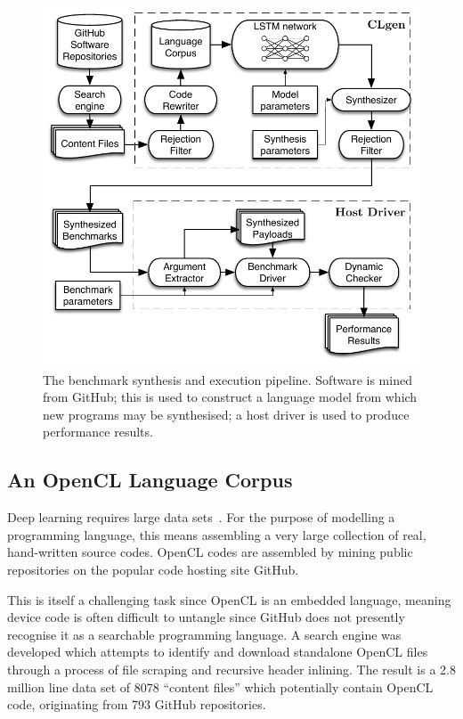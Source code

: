 \begin{figure}
	\centering%
	\includegraphics[width=\columnwidth]{img/pipeline}%
	\caption[Benchmark synthesis and execution pipeline]{%
    The benchmark synthesis and execution pipeline. Software is mined from GitHub; this is used to construct a language model from which new programs may be synthesised; a host driver is used to produce performance results.%
  }%
	\label{fig:clgen-pipeline}
\end{figure}

\subsection{An OpenCL Language Corpus}
\label{subsec:opencl-lang-corpus}

Deep learning requires large data sets~\cite{LeCun2015}. For the purpose of modelling a programming language, this means assembling a very large collection of real, hand-written source codes. OpenCL codes are assembled by mining public repositories on the popular code hosting site GitHub.

This is itself a challenging task since OpenCL is an embedded language, meaning device code is often difficult to untangle since GitHub does not presently recognise it as a searchable programming language. A search engine was developed which attempts to identify and download standalone OpenCL files through a process of file scraping and recursive header inlining. The result is a 2.8 million line data set of 8078 ``content files'' which potentially contain OpenCL code, originating from 793 GitHub repositories.

